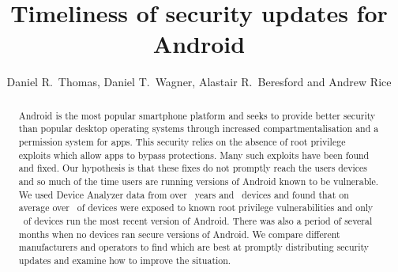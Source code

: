 \documentclass[conference,a4paper,twoside]{IEEEtran}
\author{Daniel R.\ Thomas, Daniel T.\ Wagner, Alastair R.\ Beresford and Andrew Rice}
\begin{document}
\title{Timeliness of security updates for Android}


\author{
}


\maketitle


\begin{abstract}
Android is the most popular smartphone platform and seeks to provide better security than popular desktop operating systems through increased compartmentalisation and a permission system for apps.
This security relies on the absence of root privilege exploits which allow apps to bypass protections.
Many such exploits have been found and fixed.
Our hypothesis is that these fixes do not promptly reach the users devices and so much of the time users are running versions of Android known to be vulnerable.
We used Device Analyzer data from over \daOSYearsOfData\ years and \daNumOSDevices\ devices and found that on average over \daMeanInsecurityPerc\ of devices were exposed to known root privilege vulnerabilities and only \daUpdatednessPerc\ of devices run the most recent version of Android.
There was also a period of several months when no devices ran secure versions of Android.
We compare different manufacturers and operators to find which are best at promptly distributing security updates and examine how to improve the situation. %
\end{abstract}
\end{document}
